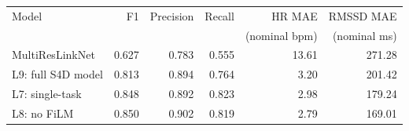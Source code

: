 \begin{tabular}{lrrrrr}\toprule
Model & F1 & Precision & Recall & HR MAE & RMSSD MAE \\ & & & & (nominal bpm) & (nominal ms)\\\midrule
MultiResLinkNet & 0.627 & 0.783 & 0.555 & 13.61 & 271.28 \\
L9: full S4D model & 0.813 & 0.894 & 0.764 & 3.20 & 201.42 \\
L7: single-task & 0.848 & 0.892 & 0.823 & 2.98 & 179.24 \\
L8: no FiLM & 0.850 & 0.902 & 0.819 & 2.79 & 169.01 \\
\bottomrule\end{tabular}
